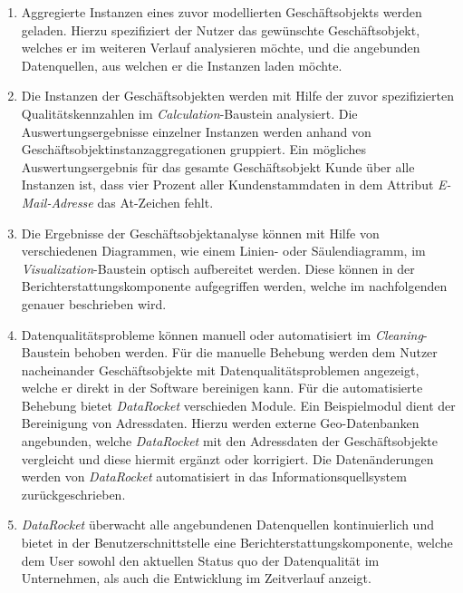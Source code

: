 \documentclass[
  language=german, %
  type=bachelor%
]{isthesis}
\begin{document}
\begin{content}
\begin{enumerate}
		\item Aggregierte Instanzen eines zuvor modellierten Geschäftsobjekts
		werden geladen. Hierzu spezifiziert der Nutzer das gewünschte
		Geschäftsobjekt, welches er im weiteren Verlauf analysieren möchte, und die
		angebunden Datenquellen, aus welchen er die Instanzen laden möchte.

		\item Die Instanzen der Geschäftsobjekten werden mit Hilfe der zuvor
		spezifizierten Qualitätskennzahlen im \textit{Calculation}-Baustein
		analysiert. Die Auswertungsergebnisse einzelner Instanzen werden anhand von
		Geschäftsobjektinstanzaggregationen gruppiert. Ein mögliches
		Auswertungsergebnis für das gesamte Geschäftsobjekt Kunde über alle
		Instanzen ist, dass vier Prozent aller Kundenstammdaten in dem Attribut
		\textit{E-Mail-Adresse} das At-Zeichen fehlt.

    \item Die Ergebnisse der Geschäftsobjektanalyse können mit Hilfe von
      verschiedenen Diagrammen, wie \zB{} einem Linien- oder Säulendiagramm, im
      \textit{Visualization}-Baustein optisch aufbereitet werden. Diese können
      in der Berichterstattungskomponente aufgegriffen werden, welche im
      nachfolgenden genauer beschrieben wird.

    \item Datenqualitätsprobleme können manuell oder automatisiert im
      \textit{Cleaning}-Baustein behoben werden. Für die manuelle Behebung
      werden dem Nutzer nacheinander Geschäftsobjekte mit
      Datenqualitätsproblemen angezeigt, welche er direkt in der Software
      bereinigen kann. Für die automatisierte Behebung bietet
      \textit{DataRocket} verschieden Module. Ein Beispiel\-modul dient der
      Bereinigung von Adressdaten. Hierzu werden externe
      Geo-Datenbanken  angebunden, welche
      \textit{DataRocket} mit den Adressdaten der Geschäftsobjekte vergleicht
			und diese hiermit \ggf{} ergänzt oder korrigiert. Die Datenänderungen
			werden von \textit{DataRocket} automatisiert in das
			Informationsquellsystem zurückgeschrieben.

    \item \textit{DataRocket} überwacht alle angebundenen Datenquellen
      kontinuierlich und bietet in der Benutzerschnittstelle eine
      Berichterstattungskomponente, welche dem User sowohl den aktuellen Status
      quo der Datenqualität im Unternehmen, als auch die Entwicklung im
      Zeitverlauf anzeigt.
	\end{enumerate}


\end{content}
\end{document}
